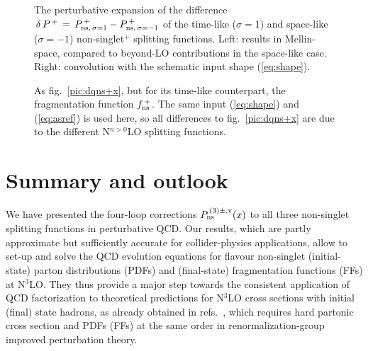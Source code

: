 \documentclass[12pt]{article}
\begin{document}
\begin{figure}[p]
\vspace{-3mm}
\centerline{}
\vspace{-2mm}
\caption{ \small \label{pic:dtsPns1}
 The perturbative expansion of the difference $\,\delta\, P^{\,+} \,=\, 
 P^{\,+}_{{\rm ns},\,\sigma=1} - P^{\,+}_{{\rm ns},\,\sigma=-1}$ of the 
 time-like ($\sigma=1$) and space-like ($\sigma=-1$) non-singlet$^+$ splitting 
 functions.
 Left: results in Mellin-space, compared to beyond-LO contributions in the
 space-like case. Right: convolution with the schematic input shape 
 (\ref{eq:shape}).
 }
\end{figure}
%
\begin{figure}[p]
\vspace{-1mm}
\centerline{}
\vspace{-3mm}
\caption{ \small \label{pic:dfns+T}
 As fig.~\ref{pic:dqns+x}, but for its time-like counterpart, the fragmentation 
 function $f_{\rm ns}^{\,+}$. 
 The same input (\ref{eq:shape}) and (\ref{eq:asref}) is used here, so all 
 differences to fig.~\ref{pic:dqns+x} are due to the different N$^{n>0}$LO 
 splitting functions.
 }
\vspace*{-1mm}
\end{figure}

%
\setcounter{equation}{0}
\section{Summary and outlook}
\label{sec:summ}
%

We have presented the four-loop corrections $P_{\rm ns}^{\,(3)\pm,\rm v}(x)$ 
to all three non-singlet splitting functions in perturbative QCD. 
Our results, which are partly approximate but 
sufficiently accurate for 
collider-physics applications, allow to set-up and solve the QCD evolution 
equations for flavour non-singlet (initial-state) parton distributions (PDFs) 
and (final-state) fragmentation functions (FFs) at N$^3$LO.
%
They thus provide a major step towards the consistent application of QCD 
factorization to theoretical predictions for N$^3$LO cross sections with
initial (final) state hadrons, as already obtained in 
refs.~\cite{Anastasiou:2015ema,Vermaseren:2005qc,Moch:2008fj,Davies:2016ruz,%
Dreyer:2016oyx}, which requires hard partonic cross section and PDFs (FFs) at 
the same order in renormalization-group improved perturbation theory.
 
\end{document}

